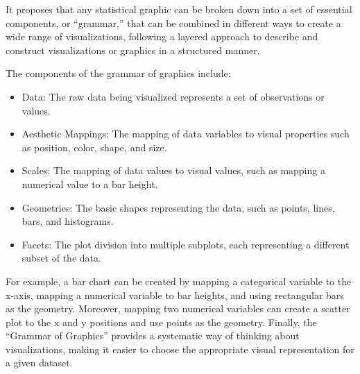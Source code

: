 \documentclass[print]{nuthesis}
\begin{document}
It proposes that any statistical graphic can be broken down into a set of essential components, or ``grammar,'' that can be combined in different ways to create a wide range of visualizations, following a layered approach to describe and construct visualizations or graphics in a structured manner.

The components of the grammar of graphics include:

\begin{itemize}
\item
  Data: The raw data being visualized represents a set of observations or values.
\item
  Aesthetic Mappings: The mapping of data variables to visual properties such as position, color, shape, and size.
\item
  Scales: The mapping of data values to visual values, such as mapping a numerical value to a bar height.
\item
  Geometries: The basic shapes representing the data, such as points, lines, bars, and histograms.
\item
  Facets: The plot division into multiple subplots, each representing a different subset of the data.
\end{itemize}

For example, a bar chart can be created by mapping a categorical variable to the x-axis, mapping a numerical variable to bar heights, and using rectangular bars as the geometry.
Moreover, mapping two numerical variables can create a scatter plot to the x and y positions and use points as the geometry.
Finally, the ``Grammar of Graphics'' provides a systematic way of thinking about visualizations, making it easier to choose the appropriate visual representation for a given dataset.
\end{document}
